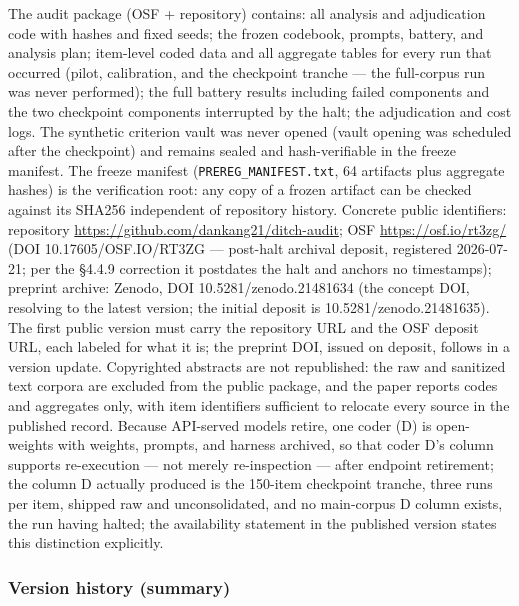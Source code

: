 The audit package (OSF + repository) contains: all analysis and adjudication code with hashes and fixed seeds; the frozen codebook, prompts, battery, and analysis plan; item-level coded data and all aggregate tables for every run that occurred (pilot, calibration, and the checkpoint tranche --- the full-corpus run was never performed); the full battery results including failed components and the two checkpoint components interrupted by the halt; the adjudication and cost logs. The synthetic criterion vault was never opened (vault opening was scheduled after the checkpoint) and remains sealed and hash-verifiable in the freeze manifest. The freeze manifest (\texttt{PREREG\_MANIFEST.txt}, 64 artifacts plus aggregate hashes) is the verification root: any copy of a frozen artifact can be checked against its SHA256 independent of repository history. Concrete public identifiers: repository \url{https://github.com/dankang21/ditch-audit}; OSF \url{https://osf.io/rt3zg/} (DOI 10.17605/OSF.IO/RT3ZG --- post-halt archival deposit, registered 2026-07-21; per the \S{}4.4.9 correction it postdates the halt and anchors no timestamps); preprint archive: Zenodo, DOI 10.5281/zenodo.21481634 (the concept DOI, resolving to the latest version; the initial deposit is 10.5281/zenodo.21481635). The first public version must carry the repository URL and the OSF deposit URL, each labeled for what it is; the preprint DOI, issued on deposit, follows in a version update. Copyrighted abstracts are not republished: the raw and sanitized text corpora are excluded from the public package, and the paper reports codes and aggregates only, with item identifiers sufficient to relocate every source in the published record. Because API-served models retire, one coder (D) is open-weights with weights, prompts, and harness archived, so that coder D's column supports re-execution --- not merely re-inspection --- after endpoint retirement; the column D actually produced is the 150-item checkpoint tranche, three runs per item, shipped raw and unconsolidated, and no main-corpus D column exists, the run having halted; the availability statement in the published version states this distinction explicitly.

\subsubsection{Version history (summary)}\label{version-history-summary}

